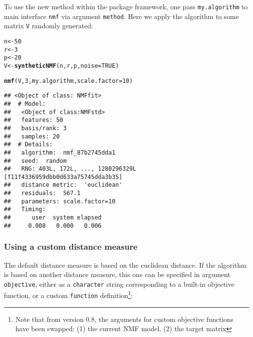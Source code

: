 \documentclass[a4paper]{article}\usepackage{graphicx, color}
\makeatletter
\newcommand{\hlfunctioncall}[1]{\textcolor[rgb]{0.501960784313725,0,0.329411764705882}{\textbf{#1}}}%
\newenvironment{kframe}{%
 \def\at@end@of@kframe{}%
 \ifinner\ifhmode%
  \def\at@end@of@kframe{\end{minipage}}%
  \begin{minipage}{\columnwidth}%
 \fi\fi%
 \def\FrameCommand##1{\hskip\@totalleftmargin \hskip-\fboxsep
 \colorbox{shadecolor}{##1}\hskip-\fboxsep
     \hskip-\linewidth \hskip-\@totalleftmargin \hskip\columnwidth}%
 \MakeFramed {\advance\hsize-\width
   \@totalleftmargin\z@ \linewidth\hsize
   \@setminipage}}%
 {\par\unskip\endMakeFramed%
 \at@end@of@kframe}
\newenvironment{knitrout}{}{} %
\let\code=\texttt
\makeatother
\begin{document}
To use the new method within the package framework, one pass \code{my.algorithm} to main interface \code{nmf} via argument \code{method}. 
Here we apply the algorithm to some matrix \code{V} randomly generated: 

\begin{knitrout}
\color{fgcolor}\begin{kframe}
\begin{alltt}
n <- 50
r <- 3
p <- 20
V <- \hlfunctioncall{syntheticNMF}(n, r, p, noise = TRUE)
\end{alltt}
\end{kframe}
\end{knitrout}


\begin{knitrout}
\color{fgcolor}\begin{kframe}
\begin{alltt}
\hlfunctioncall{nmf}(V, 3, my.algorithm, scale.factor = 10)
\end{alltt}
\begin{verbatim}
## <Object of class: NMFfit>
##  # Model:
##   <Object of class:NMFstd>
##   features: 50 
##   basis/rank: 3 
##   samples: 20 
##  # Details:
##   algorithm:  nmf_87b2745dda1 
##   seed:  random 
##   RNG: 403L, 172L, ..., 1280296329L [f11f4336959dbb0d633a75745dda3b35]
##   distance metric:  'euclidean' 
##   residuals:  567.1 
##   parameters: scale.factor=10 
##   Timing:
##      user  system elapsed 
##     0.008   0.000   0.006
\end{verbatim}
\end{kframe}
\end{knitrout}


\subsubsection{Using a custom distance measure}
The default distance measure is based on the euclidean distance. 
If the algorithm is based on another distance measure, this one can be specified in argument \code{objective}, either as a \code{character} string corresponding to a built-in objective function, or a custom \code{function} definition\footnote{Note that from version 0.8, the arguments for custom objective functions have been swapped: (1) the current NMF model, (2) the target matrix}:
\end{document}

